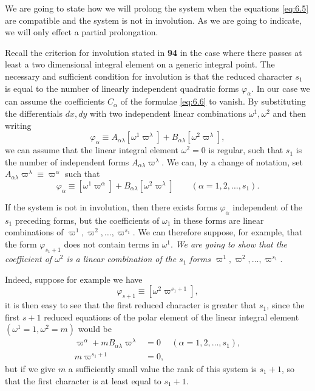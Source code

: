 \documentclass[leqno,11pt]{book}
\numberwithin{equation}{chapter}
\theoremstyle{shape1}
\theoremstyle{shape0}
\theoremstyle{shape2}
\theoremstyle{definition}
\begin{document}
We are going to state how we will prolong the system when the equations \eqref{eq:6.5} are compatible and the system is not in involution. As we are going to indicate, we will only effect a partial prolongation.



\vspace{12pt}\fsec Recall the criterion for involution stated in \textsection\textbf{94} in the case where there passes at least a two dimensional integral element on a generic integral point. The necessary and sufficient condition for involution is that the reduced character $s_{1}$ is equal to the number of linearly independent quadratic forms $\varphi_{\alpha}$. In our case we can assume the coefficients $C_{\alpha}$ of the formulae \eqref{eq:6.6} to vanish. By substituting the differentials $dx,dy$ with two independent linear combinations $\omega^{1},\omega^{2}$ and then writing
\[
\varphi_{\alpha}\equiv A_{\alpha\lambda}[\omega^{1}\varpi^{\lambda}]+B_{\alpha\lambda}[\omega^{2}\varpi^{\lambda}],
\]
we can assume that the linear integral element $\omega^{2}=0$ is regular, such that $s_{1}$ is the number of independent forms $A_{\alpha\lambda}\varpi^{\lambda}$. We can, by a change of notation, set $A_{\alpha\lambda}\varpi^{\lambda}\equiv\varpi^{\alpha}$ such that
\begin{equation}
  \label{eq:6.7}
  \varphi_{\alpha}\equiv[\omega^{1}\varpi^{\alpha}]+B_{\alpha\lambda}[\omega^{2}\varpi^{\lambda}]\qquad(\alpha=1,2,\dots,s_{1}).
\end{equation}

If the system is not in involution, then there exists forms $\varphi_{\alpha}$ independent of the $s_{1}$ preceding forms, but the coefficients of $\omega_{1}$ in these forms are linear combinations of $\varpi^{1},\varpi^{2},\dots,\varpi^{s_{1}}$. We can therefore suppose, for example, that the form $\varphi_{s_{1}+1}$ does not contain terms in $\omega^{1}$. \emph{We are going to show that the coefficient of $\omega^{2}$ is a linear combination of the $s_{1}$ forms $\varpi^{1},\varpi^{2},\dots,\varpi^{s_{1}}$}.

Indeed, suppose for example we have
\[
\varphi_{s+1}\equiv[\omega^{2}\varpi^{s_{1}+1}],
\]
it is then easy to see that the first reduced character is greater that $s_{1}$, since the first $s+1$  reduced equations of the polar element of the linear integral element $(\omega^{1}=1,\omega^{2}=m)$ would be
\begin{align*}
  \varpi^{\alpha}+mB_{\alpha\lambda}\varpi^{\lambda}&=0&(\alpha=1,2,\dots,s_{1}),\\
  m\varpi^{s_{1}+1}&=0,
\end{align*}
but if we give $m$ a sufficiently small value the rank of this system is $s_{1}+1$, so that the first character is at least equal to $s_{1}+1$.
\end{document}
